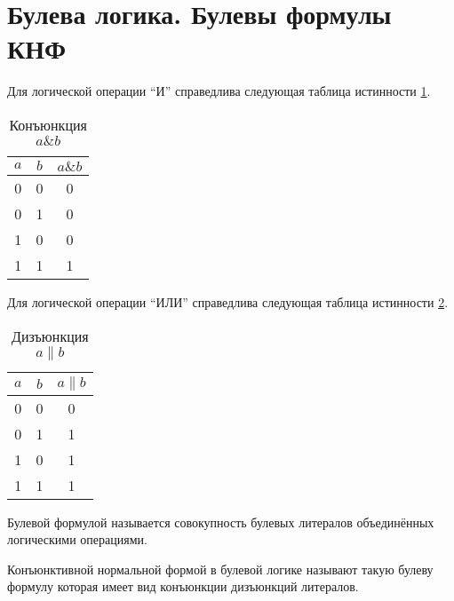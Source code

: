 \section{Булева логика. Булевы формулы КНФ}

\begin{definition}
Для логической операции ``И'' справедлива следующая таблица
истинности \ref{tblAddAlgoAND}.
\begin{table}
\centering
\begin{tabular}{|c|c|c|}
\hline
$a$ & $b$ & $a \& b$ \\ \hline
0  & 0 & 0 \\
0  & 1 & 0 \\
1  & 0 & 0 \\
1  & 1 & 1 \\ \hline
\end{tabular}
\caption{Конъюнкция $a \& b$}
\label{tblAddAlgoAND}
\end{table}
\end{definition}

\begin{definition}
Для логической операции ``ИЛИ'' справедлива следующая таблица
истинности \ref{tblAddAlgoOR}.
\begin{table}
\centering
\begin{tabular}{|c|c|c|}
\hline
$a$ & $b$ & $a \| b$ \\ \hline
0  & 0 & 0 \\
0  & 1 & 1 \\
1  & 0 & 1 \\
1  & 1 & 1 \\ \hline
\end{tabular}
\caption{Дизъюнкция $a \| b$}
\label{tblAddAlgoOR}
\end{table}
\end{definition}

\begin{definition}
Булевой формулой называется совокупность булевых литералов
объединённых логическими операциями.
\end{definition}

\begin{definition}
Конъюнктивной нормальной формой в булевой логике называют такую булеву
формулу которая имеет вид конъюнкции дизъюнкций литералов.
\end{definition}

